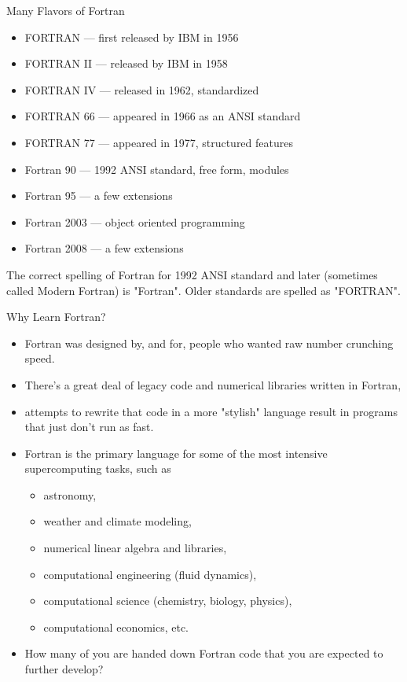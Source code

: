 \documentclass[c,mathserif,compress,xcolor=svgnames]{beamer}
\begin{document}
\begin{frame}{Many Flavors of Fortran}
  \begin{itemize}
    \item FORTRAN --- first released by IBM in 1956
    \item FORTRAN II --- released by IBM in 1958
    \item FORTRAN IV --- released in 1962, standardized
    \item FORTRAN 66 --- appeared in 1966 as an ANSI standard
    \item FORTRAN 77 --- appeared in 1977, structured features
    \item Fortran 90 --- 1992 ANSI standard, free form, modules
    \item Fortran 95 --- a few extensions
    \item Fortran 2003 --- object oriented programming
    \item Fortran 2008 --- a few extensions
  \end{itemize}
  The correct spelling of Fortran for 1992 ANSI standard and later (sometimes called Modern Fortran) is "Fortran". Older standards are spelled as "FORTRAN". 
\end{frame}

\begin{frame}{Why Learn Fortran?}
  \begin{itemize}
    \item Fortran was designed by, and for, people who wanted raw number crunching speed. 
    \item There's a great deal of legacy code and numerical libraries written in Fortran,
    \item attempts to rewrite that code in a more "stylish" language result in programs that just don't run as fast.
    \item Fortran is the primary language for some of the most intensive supercomputing tasks, such as 
    \begin{itemize}
      \item astronomy, 
      \item weather and climate modeling, 
      \item numerical linear algebra and libraries, 
      \item computational engineering (fluid dynamics), 
      \item computational science (chemistry, biology, physics), 
      \item computational economics, etc.
    \end{itemize}
    \item How many of you are handed down Fortran code that you are expected to further develop?
  \end{itemize}
\end{frame}
\end{document}
